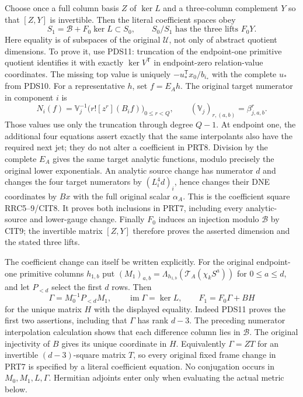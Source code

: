 \documentclass[11pt,a4paper]{article}
\begin{document}
Choose once a full column basis $Z$ of $\ker L$ and a three-column
complement $Y$ so that $[Z,Y]$ is invertible. Then the literal coefficient
spaces obey
\[
 \boxed{\quad S_1=\mathscr B+F_0\ker L\subset S_0,
       \qquad S_0/S_1\text{ has the three lifts }F_0Y.\quad}
 \tag{PRT7}
\]
Here equality is of subspaces of the original $\mathcal U$, not only
of abstract quotient dimensions. To prove it, use PDS11: truncation of
the endpoint-one primitive quotient identifies it with exactly
$\ker V^{\mathsf T}$ in endpoint-zero relation-value coordinates.
The missing top value is uniquely
$-u_*^{\mathsf T}x_0/b_{i_*}$ with the complete $u_*$ from PDS10.
For a representative $h$, set $f=E_Ah$. The original target numerator
in component $i$ is
\[
 N_i(f)=\mathbb V_j^{-1}
        \bigl(r![z^r](B_i f)\bigr)_{0\le r<Q},
 \qquad(\mathbb V_j)_{r,(a,b)}=\beta_{j,a,b}^{r}.
 \tag{PRT8}
\]
Those values use only the truncation through degree $Q-1$.
At endpoint one, the additional four equations assert exactly that
the same interpolants also have the required next jet; they do not
alter a coefficient in PRT8. Division by the complete $E_A$ gives
the same target analytic functions, modulo precisely the original lower
exponentials. An analytic source change has numerator $d$ and changes
the four target numerators by $(L_i^4d)_i$, hence changes their DNE
coordinates by $Bx$ with the full original scalar $\alpha_A$.
This is the coefficient square RRC5--9/CIT8. It proves both inclusions
in PRT7, including every analytic-source and lower-gauge change.
Finally $F_0$ induces an injection modulo $\mathscr B$ by CIT9;
the invertible matrix $[Z,Y]$ therefore proves the asserted dimension
and the stated three lifts.

The coefficient change can itself be written explicitly. For the original
endpoint-one primitive columns $h_{1,b}$ put
$ (M_1)_{a,b}=\Lambda_{h_{1,b}}(\mathcal T_A(\chi_kS^a))$
for $0\le a\le d$, and let $P_{<d}$ select the first $d$ rows.
Then
\[
 \Gamma=M_0^{-1}P_{<d}M_1,\qquad
 \operatorname{im}\Gamma=\ker L,\qquad
 F_1=F_0\Gamma+BH
 \tag{PRT7a}
\]
for the unique matrix $H$ with the displayed equality.
Indeed PDS11 proves the first two assertions, including that $\Gamma$
has rank $d-3$. The preceding numerator interpolation calculation
shows that each difference column lies in $\mathscr B$.
The original injectivity of $B$ gives its unique coordinate in $H$.
Equivalently $\Gamma=ZT$ for an invertible $(d-3)$-square matrix $T$,
so every original fixed frame change in PRT7 is specified by a literal
coefficient equation. No conjugation occurs in $M_0,M_1,L,\Gamma$.
Hermitian adjoints enter only when evaluating the actual metric below.
\end{document}
